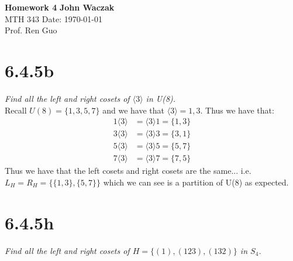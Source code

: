 \documentclass[a4paper, 11pt]{article}
\begin{document}
\noindent
\large\textbf{Homework 4} \hfill \textbf{John Waczak} \\
\normalsize MTH 343 \hfill  Date: \today \\
Prof. Ren Guo  \\

\section*{6.4.5b}
\textit{Find all the left and right cosets of $\langle 3\rangle$ in U(8).}\\

Recall $U(8) = \{1, 3, 5, 7\}$ and we have that $\langle 3 \rangle = {1, 3}$. Thus we have that: 
	\begin{align*}
		1 \langle 3 \rangle &= \langle 3 \rangle 1 = \{1 , 3\} \\ 
		3 \langle 3 \rangle &= \langle 3 \rangle 3 = \{3, 1\} \\ 
		5 \langle 3 \rangle &= \langle 3 \rangle 5 = \{5, 7\} \\ 
		7 \langle 3 \rangle &= \langle 3 \rangle 7 = \{7, 5\} 
	\end{align*}
Thus we have that the left cosets and right cosets are the same... i.e. $L_H = R_H = \{\{1,3\},\{5,7\}\}$ which we can see is a partition of U(8) as expected. 



\section*{6.4.5h}
\textit{Find all the left and right cosets of $H = \{(1), (123), (132)\}$ in $S_4$.} \\ 
\end{document}
